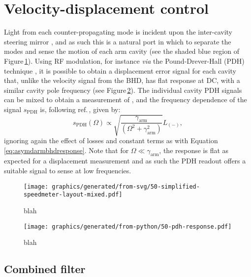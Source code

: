 \section{\label{sec:mixed-control}Velocity-displacement control}
   
Light from each counter-propagating mode is incident upon the inter-cavity steering mirror \MINT{}, and as such this is a natural port in which to separate the modes and sense the motion of each arm cavity (see the shaded blue region of Figure\,\ref{fig:simplified-speedmeter-layout-mixed}). Using RF modulation, for instance \emph{via} the Pound-Drever-Hall (\gls{PDH}) technique \cite{Drever1983}, it is possible to obtain a displacement error signal for each cavity that, unlike the velocity signal from the \gls{BHD}, has flat response at \gls{DC}, with a similar cavity pole frequency (see Figure\,\ref{fig:pdh-response}). The individual cavity \gls{PDH} signals can be mixed to obtain a measurement of \LMINUS{}, and the frequency dependence of the signal $s_{\textrm{PDH}}$ is, following ref.\,\cite{Kimble2001}, given by:
\begin{equation}
  \label{eq:m9darmpdhresponse}
  s_{\textrm{PDH}} \left( \Omega \right) \propto \sqrt{\frac{\gamma_{\textrm{arm}}}{\left(\Omega^2 + \gamma_{\textrm{arm}}^2 \right)}} L_{\left(-\right)},
\end{equation}
ignoring again the effect of losses and constant terms as with Equation \ref{eq:asymdarmbhdresponse}. Note that for $\Omega \ll \gamma_{\textrm{arm}}$, the response is flat as expected for a displacement measurement and as such the PDH readout offers a suitable signal to sense \LMINUS{} at low frequencies.

\begin{figure}
  \centering
  \texttt{[image: graphics/generated/from-svg/50-simplified-speedmeter-layout-mixed.pdf]}
  \caption{\label{fig:simplified-speedmeter-layout-mixed}blah}
\end{figure}

\begin{figure}
  \centering
  \texttt{[image: graphics/generated/from-python/50-pdh-response.pdf]}
  \caption{\label{fig:pdh-response}blah}
\end{figure}

\subsection{\label{sec:combined-filter}Combined filter}


